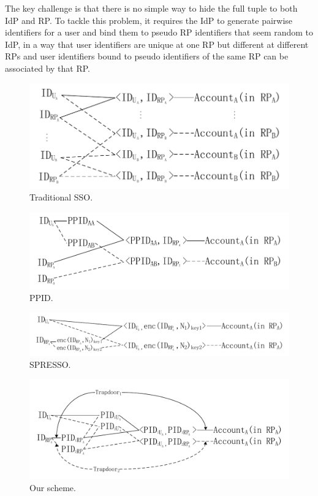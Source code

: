 The key challenge is that there is no simple way to hide the full tuple to both IdP and RP. To tackle this problem, it requires the IdP to generate pairwise identifiers for a user and bind them to pseudo RP identifiers that seem random to IdP, in a way that user identifiers are unique at one RP but different at different RPs and user identifiers bound to pseudo identifiers of the same RP can be associated by that RP.


\begin{figure}
  \centering
  \includegraphics[width=\linewidth]{fig/link1.pdf}
  \caption{Traditional SSO.}
  \label{fig:TraditionalSSO}
\end{figure}
\begin{figure}
  \centering
  \includegraphics[width=\linewidth]{fig/link4.pdf}
  \caption{PPID.}
  \label{fig:PPID}
\end{figure}
\begin{figure}
  \centering
  \includegraphics[width=\linewidth]{fig/link3.pdf}
  \caption{SPRESSO.}
  \label{fig:SPRESSO}
\end{figure}
\begin{figure}
  \centering
  \includegraphics[width=\linewidth]{fig/link2.pdf}
  \caption{Our scheme.}
  \label{fig:Ourscheme}
\end{figure}
